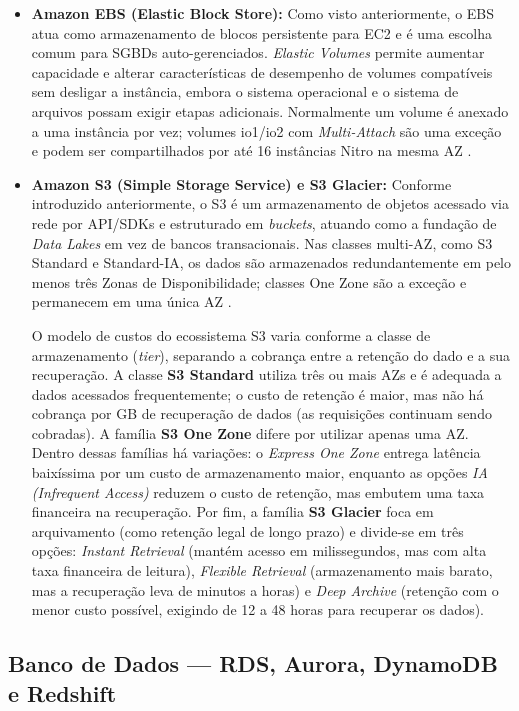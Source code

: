 \documentclass[11pt,a4paper]{article}
\begin{document}
\begin{itemize}[leftmargin=*]
    \item \textbf{Amazon EBS (Elastic Block Store):} Como visto anteriormente, o EBS atua como armazenamento de blocos persistente para EC2 e é uma escolha comum para SGBDs auto-gerenciados. \emph{Elastic Volumes} permite aumentar capacidade e alterar características de desempenho de volumes compatíveis sem desligar a instância, embora o sistema operacional e o sistema de arquivos possam exigir etapas adicionais. Normalmente um volume é anexado a uma instância por vez; volumes io1/io2 com \emph{Multi-Attach} são uma exceção e podem ser compartilhados por até 16 instâncias Nitro na mesma AZ \cite{ebsmultiattach}.
    
    \item \textbf{Amazon S3 (Simple Storage Service) e S3 Glacier:} Conforme introduzido anteriormente, o S3 é um armazenamento de objetos acessado via rede por API/SDKs e estruturado em \emph{buckets}, atuando como a fundação de \emph{Data Lakes} em vez de bancos transacionais. Nas classes multi-AZ, como S3 Standard e Standard-IA, os dados são armazenados redundantemente em pelo menos três Zonas de Disponibilidade; classes One Zone são a exceção e permanecem em uma única AZ \cite{s3classes}.
    
    O modelo de custos do ecossistema S3 varia conforme a classe de armazenamento (\emph{tier}), separando a cobrança entre a retenção do dado e a sua recuperação. A classe \textbf{S3 Standard} utiliza três ou mais AZs e é adequada a dados acessados frequentemente; o custo de retenção é maior, mas não há cobrança por GB de recuperação de dados (as requisições continuam sendo cobradas). A família \textbf{S3 One Zone} difere por utilizar apenas uma AZ. Dentro dessas famílias há variações: o \emph{Express One Zone} entrega latência baixíssima por um custo de armazenamento maior, enquanto as opções \emph{IA (Infrequent Access)} reduzem o custo de retenção, mas embutem uma taxa financeira na recuperação. Por fim, a família \textbf{S3 Glacier} foca em arquivamento (como retenção legal de longo prazo) e divide-se em três opções: \emph{Instant Retrieval} (mantém acesso em milissegundos, mas com alta taxa financeira de leitura), \emph{Flexible Retrieval} (armazenamento mais barato, mas a recuperação leva de minutos a horas) e \emph{Deep Archive} (retenção com o menor custo possível, exigindo de 12 a 48 horas para recuperar os dados).
\end{itemize}


\subsection{Banco de Dados --- RDS, Aurora, DynamoDB e Redshift}
\end{document}

